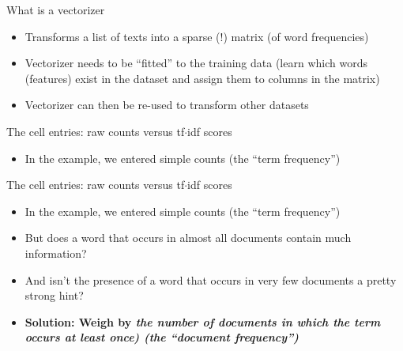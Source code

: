 
\begin{frame}{What is a vectorizer}
	\begin{itemize}[<+->]
		\item Transforms a list of texts into a sparse (!) matrix (of word frequencies)
		\item Vectorizer needs to be ``fitted'' to the training data (learn which words (features) exist in the dataset and assign them to columns in the matrix)
		\item Vectorizer can then be re-used to transform other datasets 
	\end{itemize}
\end{frame}


\begin{frame}{The cell entries: raw counts versus tf$\cdot$idf scores}
	\begin{itemize}
		\item In the example, we entered simple counts (the ``term frequency'')
	\end{itemize}
\end{frame}



\begin{frame}{The cell entries: raw counts versus tf$\cdot$idf scores}
	\begin{itemize}
		\item In the example, we entered simple counts (the ``term frequency'')
		\item But does a word that occurs in almost all documents contain much information?
		\item And isn't the presence of a word that occurs in very few documents a pretty strong hint?
		\item<2-> \textbf{Solution: Weigh by \emph{the number of documents in which the term occurs at least once) (the ``document frequency'')}} 
	\end{itemize}
\end{frame}

